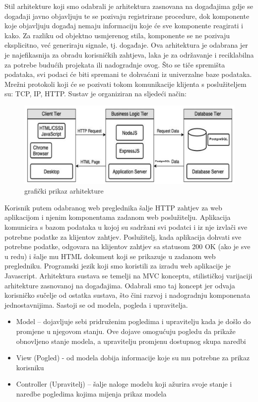 	Stil arhitekture koji smo odabrali je arhitektura zasnovana na događajima gdje se događaji javno objavljuju te se pozivaju registrirane procedure, dok komponente koje objavljuju događaj nemaju informaciju koje će sve komponente reagirati i kako. Za razliku od objektno usmjerenog stila, komponente se ne pozivaju eksplicitno, već generiraju signale, tj. događaje. Ova arhitektura je odabrana jer je najefikasnija za obradu korisničkih zahtjeva, laka je za održavanje i reciklabilna za potrebe budućih projekata ili nadogradnje ovog. Što se tiče spremišta podataka, svi podaci će biti spremani te dohvaćani iz univerzalne baze podataka. Mrežni protokoli koji će se pozivati tokom komunikacije klijenta s poslužiteljem su: TCP, IP, HTTP. 
Sustav je organiziran na sljedeći način: 
\begin{figure}[H]
			\includegraphics[width=\textwidth]{slike/arhitekturaSkica.png} %
			\caption{grafički prikaz arhitekture}
			\label{fig:arhitektura} %
			\end{figure}
Korisnik putem odabranog web preglednika šalje HTTP zahtjev za web aplikacijom i njenim komponentama zadanom web poslužitelju. Aplikacija komunicira s bazom podataka u kojoj su sadržani svi podatci i iz nje izvlači sve potrebne podatke za klijentov zahtjev. Poslužitelj, kada aplikacija dohvati sve potrebne podatke, odgovara na klijentov zahtjev sa statusom 200 OK (ako je sve u redu) i šalje mu HTML dokument koji se prikazuje u zadanom web pregledniku.
Programski jezik koji smo koristili za izradu web aplikacije je Javascript.
Arhitektura sustava se temelji na MVC konceptu, stilističkoj varijaciji arhitekture zasnovanoj na događajima. Odabrali smo taj koncept jer odvaja korisničko sučelje od ostatka sustava, što čini razvoj i nadogradnju komponenata jednostavnijima. Sastoji se od modela, pogleda i upravitelja.
		
\begin{itemize}
\item Model – dojavljuje sebi pridruženim pogledima i upravitelju kada je došlo do promjene u njegovom stanju. Ove dojave omogućuju pogledu da prikaže obnovljeno stanje modela, a upravitelju promjenu dostupnog skupa naredbi
\item View (Pogled) - od modela dobija informacije koje su mu potrebne za prikaz korisniku
\item Controller (Upravitelj)  – šalje naloge modelu koji ažurira svoje stanje i naredbe pogledima kojima mijenja prikaz modela
\end{itemize}
		

